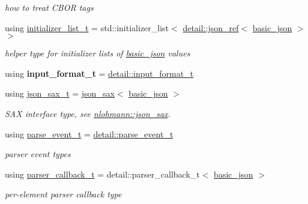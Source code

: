 \begin{DoxyCompactItemize}
\begin{DoxyCompactList}\small\item\em how to treat C\+B\+OR tags \end{DoxyCompactList}\item 
\mbox{\label{classnlohmann_1_1basic__json_ac569f292a070dfd2f6b69c16e746095a}} 
using \hyperlink{classnlohmann_1_1basic__json_ac569f292a070dfd2f6b69c16e746095a}{initializer\+\_\+list\+\_\+t} = std\+::initializer\+\_\+list$<$ \hyperlink{classnlohmann_1_1detail_1_1json__ref}{detail\+::json\+\_\+ref}$<$ \hyperlink{classnlohmann_1_1basic__json}{basic\+\_\+json} $>$ $>$
\begin{DoxyCompactList}\small\item\em helper type for initializer lists of \hyperlink{classnlohmann_1_1basic__json}{basic\+\_\+json} values \end{DoxyCompactList}\item 
\mbox{\label{classnlohmann_1_1basic__json_a211cf53702226ad9fb3c939a3a3d3689}} 
using {\bfseries input\+\_\+format\+\_\+t} = \hyperlink{namespacenlohmann_1_1detail_aa554fc6a11519e4f347deb25a9f0db40}{detail\+::input\+\_\+format\+\_\+t}
\item 
\mbox{\label{classnlohmann_1_1basic__json_a164b1094a1a9feb54e400d8510bb0b12}} 
using \hyperlink{classnlohmann_1_1basic__json_a164b1094a1a9feb54e400d8510bb0b12}{json\+\_\+sax\+\_\+t} = \hyperlink{structnlohmann_1_1json__sax}{json\+\_\+sax}$<$ \hyperlink{classnlohmann_1_1basic__json}{basic\+\_\+json} $>$
\begin{DoxyCompactList}\small\item\em S\+AX interface type, see \hyperlink{structnlohmann_1_1json__sax}{nlohmann\+::json\+\_\+sax}. \end{DoxyCompactList}\item 
using \hyperlink{classnlohmann_1_1basic__json_a24086b03c5c063849df0307f78c41c54}{parse\+\_\+event\+\_\+t} = \hyperlink{namespacenlohmann_1_1detail_a59e696b1dad6d0d99c172ac4518c2042}{detail\+::parse\+\_\+event\+\_\+t}
\begin{DoxyCompactList}\small\item\em parser event types \end{DoxyCompactList}\item 
using \hyperlink{classnlohmann_1_1basic__json_a0273d074462644e5d5a7ff313ad0d742}{parser\+\_\+callback\+\_\+t} = detail\+::parser\+\_\+callback\+\_\+t$<$ \hyperlink{classnlohmann_1_1basic__json}{basic\+\_\+json} $>$
\begin{DoxyCompactList}\small\item\em per-\/element parser callback type \end{DoxyCompactList}\end{DoxyCompactItemize}
